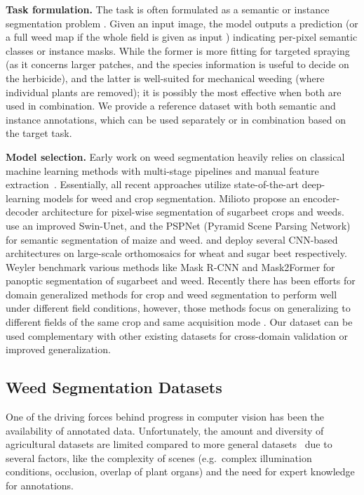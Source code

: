 \noindent \textbf{Task formulation.} The task is often formulated as a semantic or instance segmentation problem \cite{Ahmadi22iros, Champ20aps, milioto2018real, rs10091423}.
Given an input image, the model outputs a prediction (or a full weed map if the whole field is given as input \cite{rs10091423}) indicating per-pixel semantic classes or instance masks.
While the former is more fitting for targeted spraying (as it concerns larger patches, and the species information is useful to decide on the herbicide), and the latter is well-suited for mechanical weeding (where individual plants are removed); it is possibly the most effective when both are used in combination. We provide a reference dataset with both semantic and instance annotations, which can be used separately or in combination based on the target task.

\noindent \textbf{Model selection.}
Early work on weed segmentation heavily relies on classical machine learning methods with multi-stage pipelines and manual feature extraction~\cite{7989347, GUERRERO201211149, 6835733}.
Essentially, all recent approaches utilize state-of-the-art deep-learning models for weed and crop segmentation.
Milioto \etal \cite{milioto2018real} propose an encoder-decoder architecture for pixel-wise segmentation of sugarbeet crops and weeds.
\cite{agronomy13071846} use an improved Swin-Unet, and \cite{PICON2022106719} the PSPNet \cite{Zhao_2017_CVPR} (Pyramid Scene Parsing Network) for semantic segmentation of maize and weed. 
\cite{Wang_2023_ICCV} and \cite{rs10091423} deploy several CNN-based architectures on large-scale orthomosaics for wheat and sugar beet respectively.
Weyler \etal \cite{weyler2023phenobench} benchmark various methods like Mask R-CNN \cite{he2017mask} and Mask2Former \cite{cheng2021mask2former} for panoptic segmentation of sugarbeet and weed.
Recently there has been efforts for domain generalized methods for crop and weed segmentation to perform well under different field conditions, however, those methods focus on generalizing to different fields of the same crop and same acquisition mode \cite{Weyler2023TowardsDG, GAO2024122980}. Our dataset can be used complementary with other existing datasets for cross-domain validation or improved generalization.

\subsection{Weed Segmentation Datasets}
One of the driving forces behind progress in computer vision has been the availability of annotated data.
Unfortunately,
the amount and diversity of agricultural datasets are limited compared to more general datasets~\cite{Lin14eccv,Cordts16cvpr}
due to several factors, like the complexity of scenes (e.g.~complex illumination conditions, occlusion, overlap of plant organs) and the need for expert knowledge for annotations.

